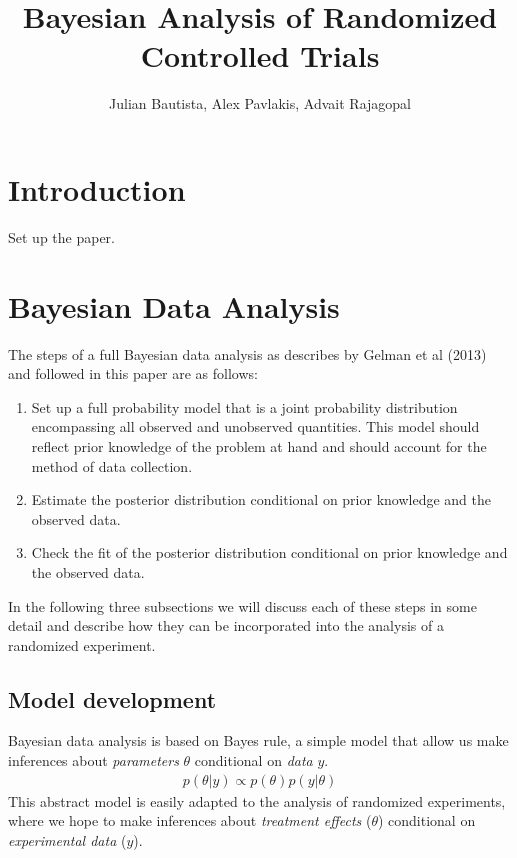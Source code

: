 \documentclass[12pt, oneside]{article}
\title{Bayesian Analysis of Randomized Controlled Trials}
\author{Julian Bautista, Alex Pavlakis, Advait Rajagopal}
\begin{document}
\maketitle

\abstract{}	

\newpage 

\tableofcontents
\newpage

\section{Introduction}
Set up the paper.

\section{Bayesian Data Analysis}
The steps of a full Bayesian data analysis as describes by Gelman et al (2013) and followed in this paper are as follows:
\begin{enumerate}
\item{Set up a full probability model that is a joint probability distribution encompassing all observed and unobserved quantities.  This model should reflect prior knowledge of the problem at hand and should account for the method of data collection.}
\item{Estimate the posterior distribution conditional on prior knowledge and the observed data.}
\item{Check the fit of the posterior distribution conditional on prior knowledge and the observed data.}
\end{enumerate}

In the following three subsections we will discuss each of these steps in some detail and describe how they can be incorporated into the analysis of a randomized experiment.

\subsection{Model development}
Bayesian data analysis is based on Bayes rule, a simple model that allow us make inferences about \emph{parameters} $\theta$ conditional on \emph{data} $y$.
\begin{align*}
p(\theta | y) \propto p(\theta)p(y | \theta)
\end{align*}
This abstract model is easily adapted to the analysis of randomized experiments, where we hope to make inferences about \emph{treatment effects} ($\theta$) conditional on \emph{experimental data} ($y$).
\\
\end{document}
